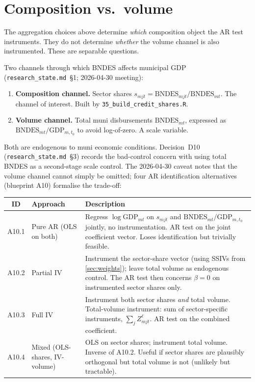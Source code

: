 \documentclass[12pt]{article}
\theoremstyle{definition}
\begin{document}
\section{Composition vs.\ volume}
\label{sec:composition-vs-volume}

The aggregation choices above determine \emph{which} composition object the AR test instruments. They do not determine \emph{whether} the volume channel is also instrumented. These are separable questions.

Two channels through which BNDES affects municipal GDP (\texttt{research\_state.md}~\S1; 2026-04-30 meeting):
\begin{enumerate}[leftmargin=2em, itemsep=2pt, label=(\arabic*)]
\item \textbf{Composition channel.} Sector shares $s_{m j t} = \mathrm{BNDES}_{m j t}/\mathrm{BNDES}_{m t}$. The channel of interest. Built by \texttt{35\_build\_credit\_shares.R}.
\item \textbf{Volume channel.} Total muni disbursements $\mathrm{BNDES}_{m t}$, expressed as $\mathrm{BNDES}_{m t}/\mathrm{GDP}_{m,t_0}$ to avoid log-of-zero. A scale variable.
\end{enumerate}

Both are endogenous to muni economic conditions. Decision~D10 (\texttt{research\_state.md}~\S3) records the bad-control concern with using total BNDES as a second-stage scale control. The 2026-04-30 caveat notes that the volume channel cannot simply be omitted; four AR identification alternatives (blueprint A10) formalise the trade-off:

\small
\begin{longtable}{@{}c >{\raggedright\arraybackslash}p{}
                    >{\raggedright\arraybackslash}p{}@{}}
\toprule
\textbf{ID} & \textbf{Approach} & \textbf{Description} \\
\midrule
\endhead
A10.1 & Pure AR (OLS on both) & Regress $\log\mathrm{GDP}_{mt}$ on $s_{mjt}$ and $\mathrm{BNDES}_{mt}/\mathrm{GDP}_{m,t_0}$ jointly, no instrumentation. AR test on the joint coefficient vector. Loses identification but trivially feasible. \\
A10.2 & Partial IV & Instrument the sector-share vector (using SSIVs from \cref{sec:weights}); leave total volume as endogenous control. The AR test then concerns $\beta = 0$ on instrumented sector shares only. \\
A10.3 & Full IV & Instrument both sector shares \emph{and} total volume. Total-volume instrument: sum of sector-specific instruments, $\sum_j Z^{\ell}_{mjt}$. AR test on the combined coefficient. \\
A10.4 & Mixed (OLS-shares, IV-volume) & OLS on sector shares; instrument total volume. Inverse of A10.2. Useful if sector shares are plausibly orthogonal but total volume is not (unlikely but tractable). \\
\bottomrule
\end{longtable}
\normalsize
\end{document}
